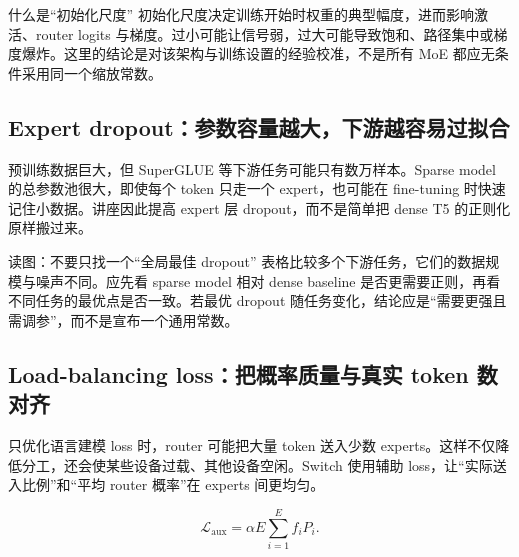 

\begin{knowledgebox}{什么是“初始化尺度”}
初始化尺度决定训练开始时权重的典型幅度，进而影响激活、router logits 与梯度。过小可能让信号弱，过大可能导致饱和、路径集中或梯度爆炸。这里的结论是对该架构与训练设置的经验校准，不是所有 MoE 都应无条件采用同一个缩放常数。
\end{knowledgebox}

\subsection{Expert dropout：参数容量越大，下游越容易过拟合}

预训练数据巨大，但 SuperGLUE 等下游任务可能只有数万样本。Sparse model 的总参数池很大，即使每个 token 只走一个 expert，也可能在 fine-tuning 时快速记住小数据。讲座因此提高 expert 层 dropout，而不是简单把 dense T5 的正则化原样搬过来。


\begin{knowledgebox}{读图：不要只找一个“全局最佳 dropout”}
表格比较多个下游任务，它们的数据规模与噪声不同。应先看 sparse model 相对 dense baseline 是否更需要正则，再看不同任务的最优点是否一致。若最优 dropout 随任务变化，结论应是“需要更强且需调参”，而不是宣布一个通用常数。
\end{knowledgebox}

\subsection{Load-balancing loss：把概率质量与真实 token 数对齐}

只优化语言建模 loss 时，router 可能把大量 token 送入少数 experts。这样不仅降低分工，还会使某些设备过载、其他设备空闲。Switch 使用辅助 loss，让“实际送入比例”和“平均 router 概率”在 experts 间更均匀。

\[
\mathcal{L}_{\text{aux}}=\alpha E\sum_{i=1}^{E} f_iP_i.
\]

